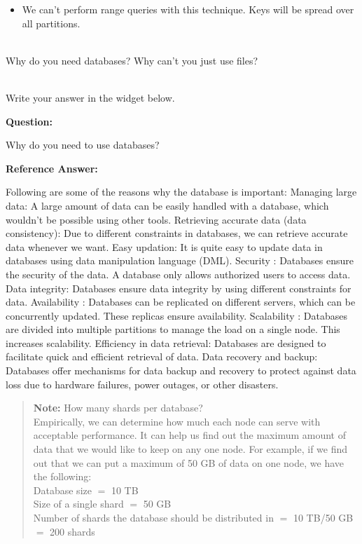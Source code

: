 \begin{itemize}
\item
\protect{}\label{_V20mpNL1-utARfkJ0OOi}
We can't perform range queries with this technique. Keys will be spread over all partitions.
\end{itemize}
\\
Why do you need databases? Why can't you just use files?\\
\strut \\
Write your answer in the widget below.

\textbf{Question:}

Why do you need to use databases?

\textbf{Reference Answer:}

Following are some of the reasons why the database is important: Managing large data: A large amount of data can be easily handled with a database, which wouldn't be possible using other tools. Retrieving accurate data (data consistency): Due to different constraints in databases, we can retrieve accurate data whenever we want. Easy updation: It is quite easy to update data in databases using data manipulation language (DML). Security : Databases ensure the security of the data. A database only allows authorized users to access data. Data integrity: Databases ensure data integrity by using different constraints for data. Availability
: Databases can be replicated on different servers, which can be concurrently updated. These replicas ensure availability. Scalability : Databases are divided into multiple partitions to manage the load on a single node. This increases scalability. Efficiency in data retrieval: Databases are designed to facilitate quick and efficient retrieval of data. Data recovery and backup: Databases offer mechanisms for data backup and recovery to protect against data loss due to hardware failures, power outages, or other disasters.

\begin{quote}
\textbf{Note:} How many shards per database?
\\
Empirically, we can determine how much each node can serve with acceptable performance. It can help us find out the maximum amount of data that we would like to keep on any one node. For example, if we find out that we can put a maximum of 50 GB of data on one node, we have the following:
\\
Database size \protect{}\label{katex_inline_NByGPA_3DUebAvj1Gjvzg}{{{\(=\)}}} 10 TB
\\
Size of a single shard \protect{}\label{katex_inline_lvB1E53iQuYF2sHhXAGut}{{{\(=\)}}} 50 GB
\\
Number of shards the database should be distributed in \protect{}\label{katex_inline_XBjNiEmPxA5Rqs5DgiXAj}{{{\(=\)}}} 10 TB/50 GB \protect{}\label{katex_inline_iHp0BedzEp2S4GxvHV3BQ}{{{\(=\)}}} 200 shards
\end{quote}
\\
